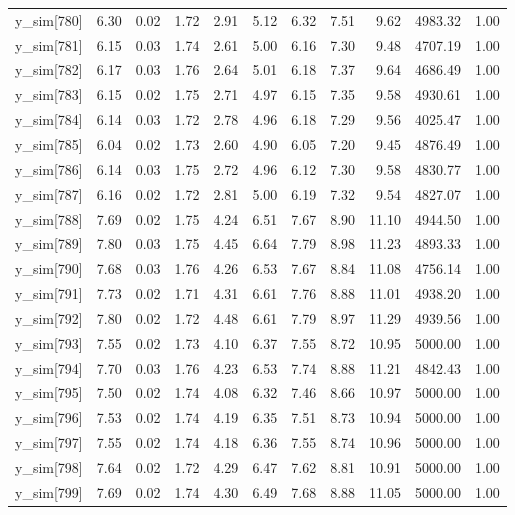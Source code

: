 \begin{table}[ht]
\begin{tabular}{rrrrrrrrrrr}
  y\_sim[780] & 6.30 & 0.02 & 1.72 & 2.91 & 5.12 & 6.32 & 7.51 & 9.62 & 4983.32 & 1.00 \\ 
  y\_sim[781] & 6.15 & 0.03 & 1.74 & 2.61 & 5.00 & 6.16 & 7.30 & 9.48 & 4707.19 & 1.00 \\ 
  y\_sim[782] & 6.17 & 0.03 & 1.76 & 2.64 & 5.01 & 6.18 & 7.37 & 9.64 & 4686.49 & 1.00 \\ 
  y\_sim[783] & 6.15 & 0.02 & 1.75 & 2.71 & 4.97 & 6.15 & 7.35 & 9.58 & 4930.61 & 1.00 \\ 
  y\_sim[784] & 6.14 & 0.03 & 1.72 & 2.78 & 4.96 & 6.18 & 7.29 & 9.56 & 4025.47 & 1.00 \\ 
  y\_sim[785] & 6.04 & 0.02 & 1.73 & 2.60 & 4.90 & 6.05 & 7.20 & 9.45 & 4876.49 & 1.00 \\ 
  y\_sim[786] & 6.14 & 0.03 & 1.75 & 2.72 & 4.96 & 6.12 & 7.30 & 9.58 & 4830.77 & 1.00 \\ 
  y\_sim[787] & 6.16 & 0.02 & 1.72 & 2.81 & 5.00 & 6.19 & 7.32 & 9.54 & 4827.07 & 1.00 \\ 
  y\_sim[788] & 7.69 & 0.02 & 1.75 & 4.24 & 6.51 & 7.67 & 8.90 & 11.10 & 4944.50 & 1.00 \\ 
  y\_sim[789] & 7.80 & 0.03 & 1.75 & 4.45 & 6.64 & 7.79 & 8.98 & 11.23 & 4893.33 & 1.00 \\ 
  y\_sim[790] & 7.68 & 0.03 & 1.76 & 4.26 & 6.53 & 7.67 & 8.84 & 11.08 & 4756.14 & 1.00 \\ 
  y\_sim[791] & 7.73 & 0.02 & 1.71 & 4.31 & 6.61 & 7.76 & 8.88 & 11.01 & 4938.20 & 1.00 \\ 
  y\_sim[792] & 7.80 & 0.02 & 1.72 & 4.48 & 6.61 & 7.79 & 8.97 & 11.29 & 4939.56 & 1.00 \\ 
  y\_sim[793] & 7.55 & 0.02 & 1.73 & 4.10 & 6.37 & 7.55 & 8.72 & 10.95 & 5000.00 & 1.00 \\ 
  y\_sim[794] & 7.70 & 0.03 & 1.76 & 4.23 & 6.53 & 7.74 & 8.88 & 11.21 & 4842.43 & 1.00 \\ 
  y\_sim[795] & 7.50 & 0.02 & 1.74 & 4.08 & 6.32 & 7.46 & 8.66 & 10.97 & 5000.00 & 1.00 \\ 
  y\_sim[796] & 7.53 & 0.02 & 1.74 & 4.19 & 6.35 & 7.51 & 8.73 & 10.94 & 5000.00 & 1.00 \\ 
  y\_sim[797] & 7.55 & 0.02 & 1.74 & 4.18 & 6.36 & 7.55 & 8.74 & 10.96 & 5000.00 & 1.00 \\ 
  y\_sim[798] & 7.64 & 0.02 & 1.72 & 4.29 & 6.47 & 7.62 & 8.81 & 10.91 & 5000.00 & 1.00 \\ 
  y\_sim[799] & 7.69 & 0.02 & 1.74 & 4.30 & 6.49 & 7.68 & 8.88 & 11.05 & 5000.00 & 1.00 \\ 

\end{tabular}
\end{table}
